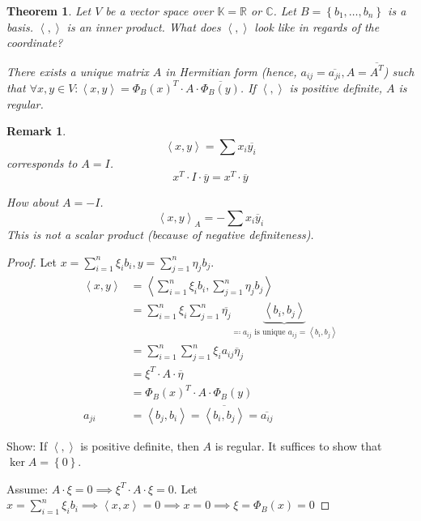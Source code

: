 \documentclass{article}
\newtheorem{theorem}{Theorem}  \numberwithin{theorem}{section}
\newtheorem{remark}{Remark}  \numberwithin{remark}{section}
\newcommand{\set}[1]{\left\{#1\right\}}
\newcommand{\angel}[1]{\left\langle#1\right\rangle}
\begin{document}
\begin{theorem} %
  Let $V$ be a vector space over $\mathbb K = \mathbb R$ or $\mathbb C$.
  Let $B = \set{b_1, \dots, b_n}$ is a basis.
  $\angel{,}$ is an inner product.
  What does $\angel{,}$ look like in regards of the coordinate?

  There exists a unique matrix $A$ in Hermitian form (hence, $a_{ij} = \overline{a_{ji}}, A = \overline{A^T}$)
  such that $\forall x,y \in V: \angel{x,y} = \Phi_B(x)^T \cdot A \cdot \overline{\Phi_B(y)}$.
  If $\angel{,}$ is positive definite, $A$ is regular.
\end{theorem}

\begin{remark}
  \[ \angel{x,y} = \sum x_i \overline{y_i} \]
  corresponds to $A = I$.
  \[ x^T \cdot I \cdot \overline{y} = x^T \cdot \overline{y} \]

  How about $A = -I$.
  \[ \angel{x,y}_A = -\sum x_i \overline{y}_i \]
  This is not a scalar product (because of negative definiteness).
\end{remark}

\begin{proof}
  Let $x = \sum_{i=1}^n \xi_i b_i, y = \sum_{j=1}^n \eta_j b_{j}$.
  \begin{align*}
    \angel{x,y} &= \angel{\sum_{i=1}^n \xi_i b_i, \sum_{j=1}^n \eta_j b_j} \\
      &= \sum_{i=1}^n \xi_i \sum_{j=1}^n \overline{\eta_j} \underbrace{\angel{b_i, b_j}}_{\eqqcolon a_{ij} \text{ is unique } a_{ij} = \angel{b_i, b_j}} \\
      &= \sum_{i=1}^n \sum_{j=1}^n \xi_i a_{ij} \overline{\eta}_j \\
      &= \xi^T \cdot A \cdot \overline{\eta} \\
      &= \Phi_B(x)^T \cdot A \cdot \Phi_B(y) \\
    a_{ji} &= \angel{b_j, b_i} = \overline{\angel{b_i, b_j}} = \overline{a_{ij}}
  \end{align*}

  Show: If $\angel{,}$ is positive definite, then $A$ is regular.
  It suffices to show that $\operatorname{ker}{A} = \set{0}$.

  Assume: $A \cdot \xi = 0 \implies \xi^T \cdot A \cdot \xi = 0$.
  Let $x = \sum_{i=1}^n \xi_i b_i \implies \angel{x,x} = 0 \implies x = 0 \implies \xi = \Phi_B(x) = 0$
\end{proof}
\end{document}

